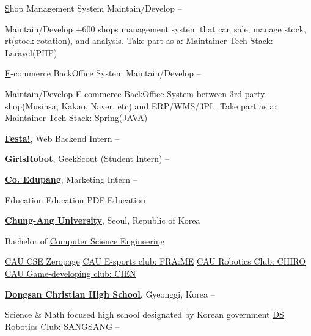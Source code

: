 \documentclass[letterpaper,MMMyyyy,nonstopmode]{simpleresumecv}
\begin{document}
\begin{Body}
\Gap
\BulletItem
\href{http://sms.fnf.co.kr}
Shop Management System Maintain/Develop
\hfill
{} --
\begin{Detail}
\SubBulletItem
Maintain/Develop +600 shops management system that can sale, manage stock, rt(stock rotation), and analysis.
\SubBulletItem
Take part as a:
Maintainer
\SubBulletItem
Tech Stack:
Laravel(PHP)
\end{Detail}

\Gap
\BulletItem
\href{http://ec.fnf.co.kr}
E-commerce BackOffice System Maintain/Develop
\hfill
{} --
\begin{Detail}
\SubBulletItem
Maintain/Develop E-commerce BackOffice System between 3rd-party shop(Musinsa, Kakao, Naver, etc) and ERP/WMS/3PL.
\SubBulletItem
Take part as a:
Maintainer
\SubBulletItem
Tech Stack:
Spring(JAVA)
\end{Detail}

\Entry
\href{http://festa.io}
{\textbf{Festa!}},
Web Backend Intern
\hfill
{} --

\Entry
{\textbf{GirlsRobot}},
GeekScout (Student Intern)
\hfill
{} --

\Entry
\href{http://edupang.com}
{\textbf{Co. Edupang}},
Marketing Intern
\hfill
{} --


\Section
{Education}
{Education}
{PDF:Education}

\Entry
\href{https://www.cau.ac.kr/index.do}
{\textbf{Chung-Ang University}},
Seoul, Republic of Korea

\Gap
\BulletItem
Bachelor of
\href{https://cse.cau.ac.kr/main.php}
{Computer Science Engineering}
\hfill
\begin{Detail}
\SubBulletItem
\href{https://zeropage.org/}
{CAU CSE Zeropage}
\hfill
\SubBulletItem
\href{https://www.facebook.com/CAUFRAME/}
{CAU E-sports club: FRA:ME}
\hfill
\SubBulletItem
\href{https://chirocau.notion.site/Introduction-to-CHIRO-6ea0f682548446a18d8f0f3b55c9b5cf}
{CAU Robotics Club: CHIRO}
\hfill
\SubBulletItem
\href{https://con.cien.or.kr/}
{CAU Game-developing club: CIEN}
\hfill
\end{Detail}

\BigGap
\Entry
\href{https://dsgo.kr/home/index.do}
{\textbf{Dongsan Christian High School}},
Gyeonggi, Korea
\hfill
{} --
\begin{Detail}
\SubBulletItem
{Science \& Math focused high school designated by Korean government}
\SubBulletItem
\href{https://cafe.naver.com/sangsanginlego2}
{DS Robotics Club: SANGSANG}
\hfill
{} --
\SubBulletItem
\end{Detail}



\end{Body}
\end{document}
